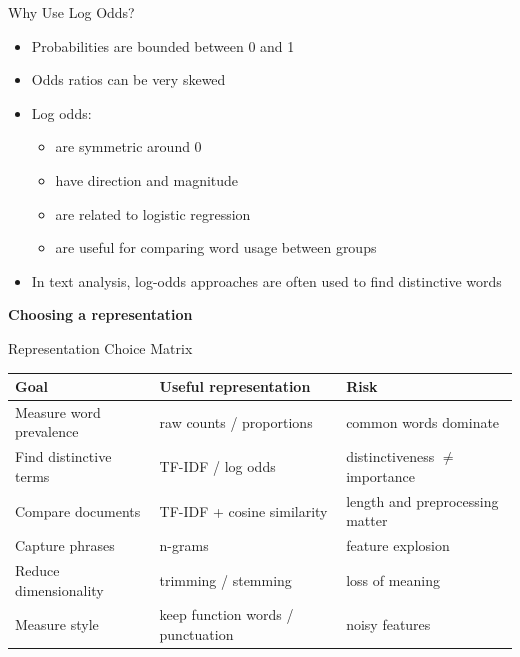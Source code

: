 \documentclass[11pt,aspectratio=43]{beamer}
\begin{document}
\begin{frame}{Why Use Log Odds?}
\begin{itemize}
\item Probabilities are bounded between 0 and 1
\item Odds ratios can be very skewed
\item Log odds:
  \begin{itemize}
  \item are symmetric around 0
  \item have direction and magnitude
  \item are related to logistic regression
  \item are useful for comparing word usage between groups
  \end{itemize}
\item In text analysis, log-odds approaches are often used to find distinctive words
\end{itemize}
\end{frame}

\begin{frame}[plain]
  \centering
  \vfill
  {\LARGE\bfseries
   Choosing a representation \par}
  \vfill
\end{frame}

\begin{frame}{Representation Choice Matrix}
\scriptsize
\centering
\begin{tabular}{p{}p{}p{}}
\toprule
\textbf{Goal} & \textbf{Useful representation} & \textbf{Risk}\\ \midrule
Measure word prevalence & raw counts / proportions & common words dominate\\
Find distinctive terms & TF-IDF / log odds & distinctiveness $\neq$ importance\\
Compare documents & TF-IDF + cosine similarity & length and preprocessing matter\\
Capture phrases & n-grams & feature explosion\\
Reduce dimensionality & trimming / stemming & loss of meaning\\
Measure style & keep function words / punctuation & noisy features\\
\bottomrule
\end{tabular}
\end{frame}
\end{document}
